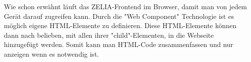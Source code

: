 
Wie schon erwähnt läuft das ZELIA-Frontend im Browser, damit man von jedem Gerät darauf zugreifen kann. Durch die "Web Component" Technologie ist es möglich eigene HTML-Elemente zu definieren. Diese HTML-Elemente können dann nach belieben, mit allen ihrer "child"-Elementen, in die Webseite hinzugefügt werden. Somit kann man HTML-Code zusammenfassen und nur anzeigen wenn es notwendig ist.


\pagebreak
{}
